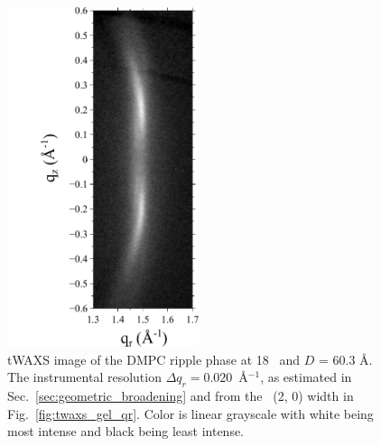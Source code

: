 \begin{figure}[htbp]
  \centering
  \includegraphics[trim=20 0 0 0,clip,width=0.5\textwidth]{figures/ripple/tWAXS/twaxs_ripple}
  \caption[tWAXS image of the DMPC
  ripple phase at 18 \textcelsius\ and $D$ = 60.3 \AA]
  {tWAXS image of the DMPC
  ripple phase at 18 \textcelsius\ and $D$ = 60.3 \AA. 
  The instrumental resolution $\Delta q_r=0.020$~\AA$^{-1}$, as estimated in 
  Sec.~\ref{sec:geometric_broadening} and from the \LbetaI\ (2, 0) width 
  in Fig.~\ref{fig:twaxs_gel_qr}. Color is linear grayscale
  with white being most intense and black being least intense.}
  \label{fig:twaxs_ripple}
\end{figure}

